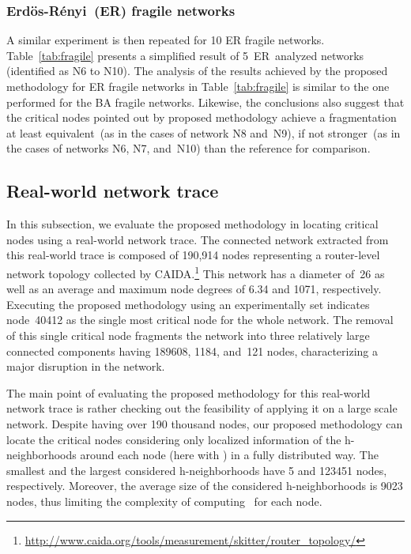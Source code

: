 \documentclass[conference,fleqn]{IEEEtran}
\begin{document}
\subsubsection{Erd\"{o}s-R\'{e}nyi~(ER) fragile networks}

A similar experiment is then repeated for 10 ER fragile networks. Table~\ref{tab:fragile} presents a simplified 
result of 5~ER~analyzed networks (identified as N6 to N10). 
The analysis of the results achieved by the proposed methodology for ER fragile networks
in Table~\ref{tab:fragile} is similar to the one performed for the BA fragile networks. Likewise, the conclusions
also suggest that the critical nodes pointed out by proposed methodology achieve a fragmentation at least
equivalent~(as in the cases of network N8 and~N9), if not stronger~(as in the cases of networks N6, N7, and~N10) than the
reference for comparison.



\subsection{Real-world network trace}

In this subsection, we evaluate the proposed methodology in locating critical nodes using a real-world network trace.
The connected network extracted from this real-world trace is composed of 190,914 nodes representing a router-level
network topology collected by CAIDA.\footnote{\url{http://www.caida.org/tools/measurement/skitter/router_topology/}}
This network has a diameter of~26 as well as an average and maximum node degrees of 6.34 and 1071, respectively.
Executing the proposed methodology using an experimentally set  indicates node~40412 as the single most critical node 
for the whole network. The 
removal of this single critical node fragments the network into three relatively large connected components having
189608, 1184, and~121 nodes, characterizing a major disruption in the network.

The main point of evaluating the proposed methodology for this real-world network trace is rather checking out
the feasibility of applying it on a large scale network. Despite having over 190 thousand nodes, our proposed
methodology can locate the critical nodes considering only localized information of the h-neighborhoods
around each node (here with ) in a fully distributed way. 
The smallest and the largest considered h-neighborhoods have 5 and 123451 nodes, respectively. 
Moreover, the average size of the considered h-neighborhoods
is 9023 nodes, thus limiting the complexity of computing~ for each node. 
\end{document}
